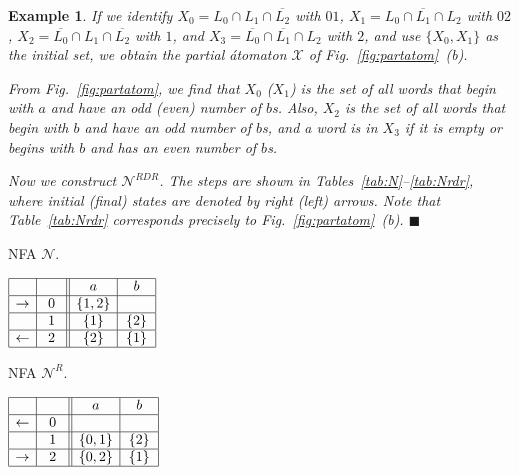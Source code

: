 \documentclass[preprint,12pt]{elsarticle}
\newcommand{\ol}{\overline}
\newcommand{\cN}{{\mathcal N}}
\newcommand{\cX}{{\mathcal X}}
\newcommand{\qedb}{\hfill$\blacksquare$}
\newtheorem{example}{Example}
\begin{document}
\begin{example}
If we identify $X_0=L_0\cap L_1\cap \ol{L_2}$ with $01$, 
$X_1=L_0\cap \ol{L_1}\cap L_2$ with $02$, 
$X_2=\ol{L_0}\cap L_1\cap \ol{L_2}$ with $1$, and 
$X_3=\ol{L_0} \cap \ol{L_1}\cap L_2$ with $2$, 
and use $\{X_0, X_1\}$ as the initial set,
we obtain the partial \'atomaton
$\cX$ of Fig.~\ref{fig:partatom}~(b).


From Fig.~\ref{fig:partatom}, we find that $X_0$ ($X_1$) is the set of all words that begin with $a$ and have an odd (even) number of $b$s.
Also, $X_2$ is the set of all words that begin with $b$ and have an odd number of $b$s, and a word is in $X_3$ if it is empty or begins with $b$ and has an even number of $b$s.

Now we construct $\cN^{RDR}$. The steps are shown in Tables~\ref{tab:N}--\ref{tab:Nrdr}, 
where initial (final) states are denoted by right (left) arrows.
Note that Table~\ref{tab:Nrdr} corresponds precisely to Fig.~\ref{fig:partatom}~(b).
\qedb
\end{example}

\begin{table}[hbt]
\begin{minipage}[b]{0.45\linewidth}
\caption{NFA $\cN$.}
\label{tab:N}
{\footnotesize
\begin{center}
$
\begin{array}{|c| c||c| c| c|c|}    
\hline
& \   \ 
&\ \ a \ \ &\ \ b \ \   \\
\hline  
\rightarrow & \  0 \
&   \{1,2\}  &     \\
\hline  
              & 1
&    \{1\}   & \{ 2 \}\\
\hline  
\leftarrow& 2
&   \{2\}   &  \{1\} \\
\hline  
\end{array}
$
\end{center}
}
\end{minipage}
\hspace{.3cm}
\begin{minipage}[b]{0.45\linewidth}
\caption{NFA $\cN^R$.}
\label{tab:Nr}
{\footnotesize
\begin{center}
$
\begin{array}{|c| c||c| c| }    
\hline
& \ \  \ \ 
&\ \ a \ \ &\ \ b \ \ \\
\hline  
\leftarrow & 0
&   &  \\
\hline  
			& \ 1 \
& \{0,1\} & \{2\} \\
\hline  
\rightarrow & 2
 &  \{0,2\} &  \{1\}  \\
\hline  
\end{array}
$
\end{center}}
\end{minipage}
\end{table}
\end{document}

